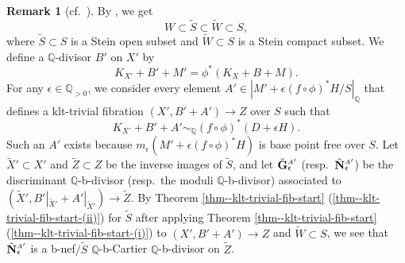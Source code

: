 \documentclass[12pt]{amsart}
\theoremstyle{definition}
\newtheorem{rem}[thm]{Remark}
\begin{document}
\begin{rem}[cf.~{\cite[Remark 4.8]{filipazzi-gen-can-bundle-formula}}]
By \cite[Lemma 2.16]{fujino-analytic-bchm}, we get
$$W \subset \tilde{S} \subset \tilde{W} \subset S,$$
where $\tilde{S}\subset S$ is a Stein open subset and $\tilde{W}\subset S$ is a Stein compact subset. 
We define a $\mathbb{Q}$-divisor $B'$ on $X'$ by 
$$K_{X'}+B'+M' = \phi^{*}(K_{X}+B+M).$$ 
For any $\epsilon \in \mathbb{Q}_{>0}$, we consider every element $A' \in |M'+\epsilon(f \circ \phi)^{*}H/S|_{\mathbb{Q}}$ that defines a klt-trivial fibration $(X',B'+A') \to Z$ over $S$ such that 
$$K_{X'}+B'+A' \sim_{\mathbb{Q}}(f \circ \phi)^{*}(D+\epsilon H).$$ 
Such an $A'$  exists because $m_{\epsilon}(M'+\epsilon (f \circ \phi)^{*}H)$ is base point free over $S$. 
Let $\tilde{X}' \subset X'$ and $\tilde{Z} \subset Z$ be the inverse images of $\tilde{S}$, and let $\tilde{\boldsymbol{\rm G}}^{\underset{A'}{}}_{\epsilon}$ (resp.~$\tilde{\boldsymbol{\rm N}}^{\underset{A'}{}}_{\epsilon}$) be the discriminant $\mathbb{Q}$-b-divisor (resp.~the moduli $\mathbb{Q}$-b-divisor) associated to $(\tilde{X}',B'|_{\tilde{X}'}+A'|_{\tilde{X}'}) \to \tilde{Z}$. 
By Theorem \ref{thm--klt-trivial-fib-start} (\ref{thm--klt-trivial-fib-start-(ii)}) for $\tilde{S} $ after applying Theorem \ref{thm--klt-trivial-fib-start} (\ref{thm--klt-trivial-fib-start-(i)}) to $(X',B'+A') \to Z$ and $\tilde{W} \subset S$, we see that $\tilde{\boldsymbol{\rm N}}^{\underset{A'}{}}_{\epsilon}$ is a b-nef$/\tilde{S}$ $\mathbb{Q}$-b-Cartier $\mathbb{Q}$-b-divisor on $\tilde{Z}$. 


\end{rem}
\end{document}
